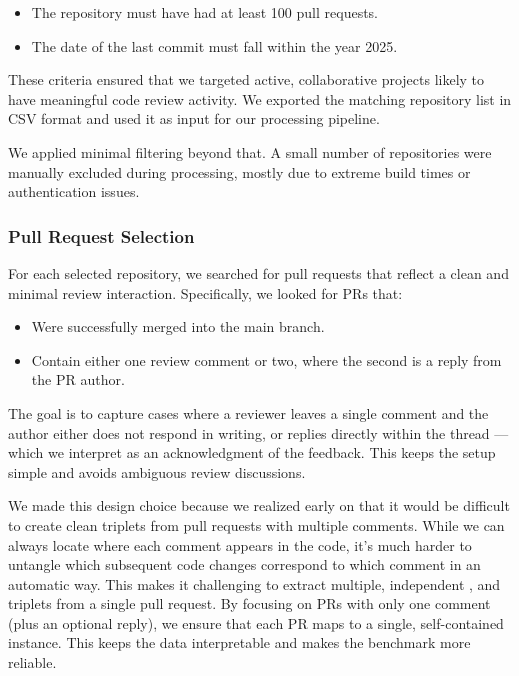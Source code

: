 \begin{itemize}
	\item The repository must have had at least 100 pull requests.
	\item The date of the last commit must fall within the year 2025.
\end{itemize}

These criteria ensured that we targeted active, collaborative projects likely to have meaningful
code review activity. We exported the matching repository list in CSV format and used it as input
for our processing pipeline.

We applied minimal filtering beyond that. A small number of repositories were manually excluded
during processing, mostly due to extreme build times or authentication issues.

\subsubsection{Pull Request Selection}

For each selected repository, we searched for pull requests that reflect a clean and minimal review
interaction. Specifically, we looked for PRs that:

\begin{itemize}
	\item Were successfully merged into the main branch.
	\item Contain either one review comment or two, where the second is a reply from the PR author.
\end{itemize}

The goal is to capture cases where a reviewer leaves a single comment and the author either does not
respond in writing, or replies directly within the thread — which we interpret as an acknowledgment
of the feedback. This keeps the setup simple and avoids ambiguous review discussions.

We made this design choice because we realized early on that it would be difficult to create clean
triplets from pull requests with multiple comments. While we can always locate where each comment
appears in the code, it's much harder to untangle which subsequent code changes correspond to which
comment in an automatic way. This makes it challenging to extract multiple, independent \subCode,
\revComment and \revCode triplets from a single pull request. By focusing on PRs with only one
comment (plus an optional reply), we ensure that each PR maps to a single, self-contained instance.
This keeps the data interpretable and makes the benchmark more reliable.

